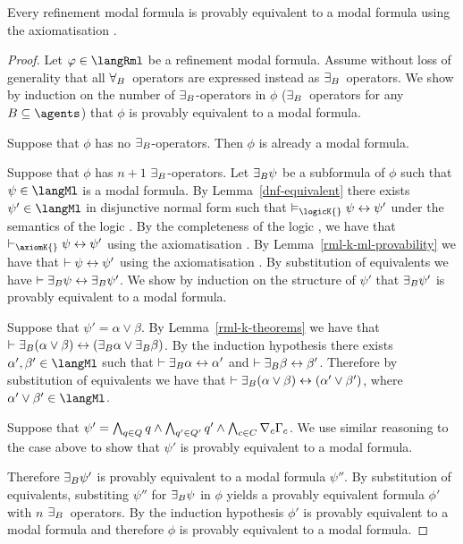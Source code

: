 \begin{lemma}\label{rml-k-ml-equivalent}
Every refinement modal formula is provably equivalent to a modal formula using the axiomatisation \axiomRmlK{}.
\end{lemma}

\begin{proof}
Let $\phi \in \langRml$ be a refinement modal formula.
Assume without loss of generality that all ${\forall_{B}}$~operators are expressed instead as ${\exists_{B}}$~operators.
We show by induction on the number of ${\exists_{B}}$-operators in $\phi$ (${\exists_{B}}$~operators for any $\agentsB \subseteq \agents$) that $\phi$ is provably equivalent to a modal formula.

Suppose that $\phi$ has no ${\exists_{B}}$-operators.
Then $\phi$ is already a modal formula.

Suppose that $\phi$ has $n + 1$ ${\exists_{B}}$-operators.
Let ${\exists_{B}} \psi$ be a subformula of $\phi$ such that $\psi \in \langMl$ is a modal formula.
By Lemma~\ref{dnf-equivalent} there exists $\psi' \in \langMl$ in disjunctive normal form such that $\entails_\logicK{} \psi \iff \psi'$ under the semantics of the logic \logicK{}.
By the completeness of the logic \logicK{}, we have that $\proves_\axiomK{} \psi \iff \psi'$ using the axiomatisation \axiomK{}.
By Lemma~\ref{rml-k-ml-provability} we have that $\vdash \psi \leftrightarrow \psi'$ using the axiomatisation \axiomRmlK{}.
By substitution of equivalents we have $\vdash {\exists_{B}} \psi \leftrightarrow {\exists_{B}} \psi'$.
We show by induction on the structure of $\psi'$ that ${\exists_{B}} \psi'$ is provably equivalent to a modal formula.

Suppose that $\psi' = \alpha \lor \beta$.
By Lemma~\ref{rml-k-theorems} we have that $\vdash {\exists_{B}} (\alpha \lor \beta) \leftrightarrow ({\exists_{B}} \alpha \lor {\exists_{B}} \beta)$.
By the induction hypothesis there exists $\alpha', \beta' \in \langMl$ such that $\vdash {\exists_{B}} \alpha \leftrightarrow \alpha'$ and $\vdash {\exists_{B}} \beta \leftrightarrow \beta'$.
Therefore by substitution of equivalents we have that $\vdash {\exists_{B}} (\alpha \lor \beta) \leftrightarrow (\alpha' \lor \beta')$, where $\alpha' \lor \beta' \in \langMl$.

Suppose that $\psi' = \bigwedge_{q \in Q} q \land \bigwedge_{q' \in Q'} q' \land \bigwedge_{c \in C} \nabla_{c} \Gamma_c$.
We use similar reasoning to the case above to show that $\psi'$ is provably equivalent to a modal formula.

Therefore ${\exists_{B}} \psi'$ is provably equivalent to a modal formula $\psi''$.
By substitution of equivalents, substiting $\psi''$ for ${\exists_{B}} \psi$ in $\phi$ yields a provably equivalent formula $\phi'$ with $n$ ${\exists_{B}}$~operators.
By the induction hypothesis $\phi'$ is provably equivalent to a modal formula and therefore $\phi$ is provably equivalent to a modal formula.
\end{proof}

